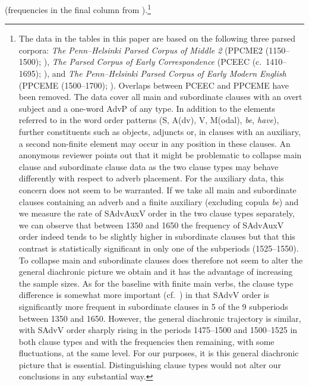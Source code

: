 \documentclass[output=paper]{langsci/langscibook}
\begin{document}
(frequencies in the final column from \citealt[512]{HaeIhs2016}).\footnote{The
    data in the tables in this paper are based on the following three parsed
    corpora: \emph{The Penn--Helsinki Parsed Corpus of Middle  2}
    (\gls{PPCME2} (1150--1500); \citealt{KroTay2000}), \emph{The Parsed Corpus
    of Early  Correspondence} (\gls{PCEEC} (c.\ 1410--1695);
    \citealt{TaylorEtAl2006}), and \emph{The Penn--Helsinki Parsed Corpus of
    Early Modern English} (\gls{PPCEME} (1500--1700); \citealt{KrochEtAl2010}).
    Overlaps between PCEEC and PPCEME have been removed.  The data cover all
    main and subordinate clauses with an overt subject and a one-word AdvP of
    any type.  In addition to the elements referred to in the word order
    patterns (S, A(dv), V, M(odal), \emph{be}, \emph{have}), further
    constituents such as objects, adjuncts or, in clauses with an
    auxiliary, a second non-finite element may occur in any position in
    these clauses. An anonymous reviewer points out that it might be
    problematic to collapse main clause and subordinate clause data as the two
    clause types may behave differently with respect to adverb placement. For
    the auxiliary data, this concern does not seem to be warranted. If we
    take all main and subordinate clauses containing an adverb and a finite
    auxiliary (excluding copula \emph{be}) and we measure the rate of
    SAdvAuxV order in the two clause types separately, we can observe that
    between 1350 and 1650 the frequency of SAdvAuxV order indeed tends to be
    slightly higher in subordinate clauses but that this contrast is
    statistically significant in only one of the subperiods (1525--1550). To
    collapse main and subordinate clauses does therefore not seem to alter the
    general diachronic picture we obtain and it has the advantage of increasing
    the sample sizes. As for the baseline with finite main verbs, the clause
    type difference is somewhat more important (cf.\ \citealt[524, fn.\
    52]{HaeIhs2016}) in that SAdvV order is significantly more frequent in
    subordinate clauses in 5 of the 9 subperiods between 1350 and 1650.
    However, the general diachronic trajectory is similar, with SAdvV order
    sharply rising in the periods 1475--1500 and 1500--1525 in both clause types
    and with the frequencies then remaining, with some fluctuations, at the
    same level.  For our purposes, it is this general diachronic picture that
    is essential.  Distinguishing clause types would not alter our conclusions
in any substantial way.}
\end{document}
